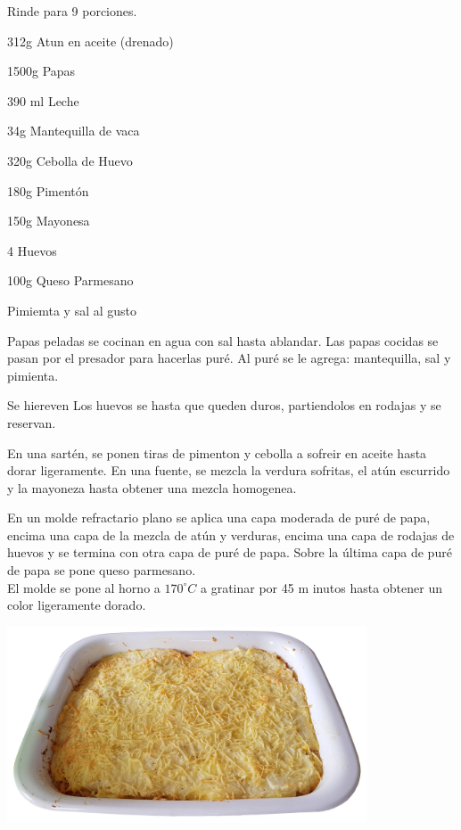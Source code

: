 
Rinde para 9 porciones.\\

\begin{ingredientes}
\item 312g Atun en aceite (drenado)
\item 1500g Papas
\item 390 ml Leche
\item 34g Mantequilla de vaca
\item 320g Cebolla de Huevo
\item 180g Pimentón
\item 150g Mayonesa
\item 4 Huevos
\item 100g Queso Parmesano
\item Pimiemta y sal al gusto
\end{ingredientes}
\preparacion

Papas peladas se cocinan en agua con sal hasta ablandar. Las papas cocidas se pasan por el presador para hacerlas puré. Al puré se le agrega: mantequilla, sal y pimienta.

Se hiereven Los huevos se hasta que queden duros, partiendolos en rodajas y se reservan.

En una sartén, se ponen tiras de pimenton y cebolla a sofreir en aceite hasta dorar ligeramente. En una fuente, se mezcla la verdura sofritas, el atún escurrido y la mayoneza hasta obtener una mezcla homogenea. 

En un molde refractario plano se aplica una capa moderada de puré de papa, encima una capa de la mezcla de atún y verduras, encima una capa de rodajas de huevos y se termina con otra capa de puré de papa. Sobre la última capa de puré de papa se pone queso parmesano.\\

El molde se pone al horno a $170^{\circ}C$  a gratinar por 45 m inutos hasta obtener un color ligeramente dorado.\\

\vspace*{2cm}
\begin{center}
\includegraphics[width=0.8\textwidth]{fotos/molde_atun_2.jpeg}
\end{center}


